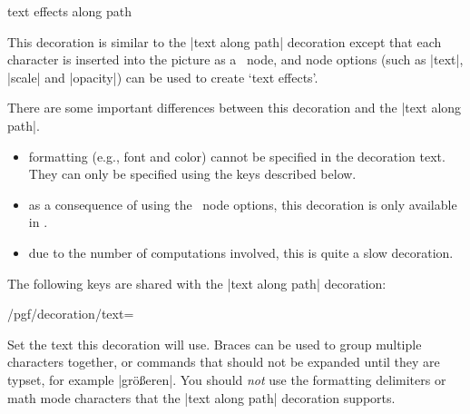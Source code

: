 \begin{decoration}{text effects along path}

  This decoration is similar to the |text along path| decoration
  except that each character is inserted into the picture
  as a \tikzname\ node, and node options (such as |text|, |scale| and |opacity|)
  can be used to create `text effects'.

\begin{codeexample}[]
\bfseries\large
{}
\end{codeexample}


  There are some important differences between this decoration and the
  |text along path|.
  
  \begin{itemize}
  \item 
    formatting (e.g., font and color)
  	cannot be specified in the decoration text. They can only be specified
  	using the keys described below.  	
 	\item
 	  as a consequence of using the \tikzname\ node options, this
  	decoration is only available in \tikzname.
  \item
  	due to the number of computations involved, this is
  	quite a slow decoration.
  	
  \end{itemize}
 
  The following keys are shared with the |text along path|
  decoration:
  
\begin{key}{/pgf/decoration/text=}


  Set the text this decoration will use. Braces can be
  used to group multiple characters together, 
  or commands that should not be expanded until they are typset, for example
  |gr{\"o}{\ss}eren|. You should \emph{not} use the formatting 
  delimiters or math mode characters 
  that the |text along path| decoration  supports.
  

\end{key}
\end{decoration}
